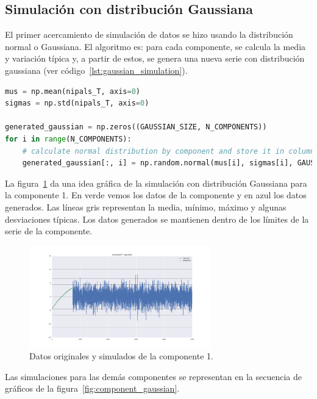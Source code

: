 \documentclass[11pt,spanish,listoffigures,listoftables]{tfgetsinf}
\begin{document}
    \subsection{Simulación con distribución Gaussiana}
    El primer acercamiento de simulación de datos se hizo usando la distribución normal o Gaussiana. El algoritmo es: para cada componente, se calcula la media y variación típica y, a partir de estos, se genera una nueva serie con distribución gaussiana (ver código~\ref{lst:gaussian_simulation}).
    
    \begin{lstlisting}[language=Python, caption=Simulación con distribución Gaussiana., label={lst:gaussian_simulation}]
mus = np.mean(nipals_T, axis=0)
sigmas = np.std(nipals_T, axis=0)

generated_gaussian = np.zeros((GAUSSIAN_SIZE, N_COMPONENTS))
for i in range(N_COMPONENTS):
    # calculate normal distribution by component and store it in column i
    generated_gaussian[:, i] = np.random.normal(mus[i], sigmas[i], GAUSSIAN_SIZE)
    \end{lstlisting}
    
    La figura~\ref{fig:component_0_gaussian} da una idea gráfica de la simulación con distribución Gaussiana para la componente 1. En verde vemos los datos de la componente y en azul los datos generados. Las líneas gris representan la media, mínimo, máximo y algunas desviaciones típicas. Los datos generados se mantienen dentro de los límites de la serie de la componente.

    \begin{figure}[H]
        \centering
        \includegraphics[width=0.7\textwidth]{component_1_gaussian.png}
        \caption{Datos originales y simulados de la componente 1.}
        \label{fig:component_0_gaussian}
    \end{figure}   
    
    Las simulaciones para las demás componentes se representan en la secuencia de gráficos de la figura~\ref{fig:component_gaussian}.
    
\end{document}
